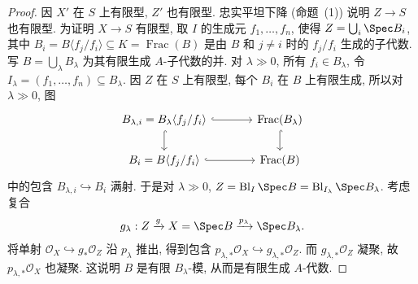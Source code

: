 \begin{proof}
因 $X'$ 在 $S$ 上有限型, $Z'$ 也有限型. 忠实平坦下降 (命题~(1)) 说明 $Z\to S$ 也有限型. 为证明 $X\to S$ 有限型, 取 $I$ 的生成元 $f_1,\ldots,f_n$, 使得 $Z=\bigcup_i\Spec B_i$, 其中 $B_i=B\langle f_j/f_i\rangle\subseteq K=\operatorname{Frac}(B)$ 是由 $B$ 和 $j\ne i$ 时的 $f_j/f_i$ 生成的子代数. 写 $B=\bigcup_\lambda B_\lambda$ 为其有限生成 $A$-子代数的并. 对 $\lambda\gg0$, 所有 $f_i\in B_\lambda$, 令 $I_\lambda=(f_1,\ldots,f_n)\subseteq B_\lambda$. 因 $Z$ 在 $S$ 上有限型, 每个 $B_i$ 在 $B$ 上有限生成, 所以对 $\lambda\gg0$, 图
\begin{align*}
\begin{tikzcd}[ampersand replacement=\&,column sep=large]
B_{\lambda,i}=B_\lambda\langle f_j/f_i\rangle\arrow[r,hook]\arrow[d,hook]\&\operatorname{Frac}(B_\lambda)\arrow[d,hook]\\
B_i=B\langle f_j/f_i\rangle\arrow[r,hook]\&\operatorname{Frac}(B)
\end{tikzcd}
\end{align*}
中的包含 $B_{\lambda,i}\hookrightarrow B_i$ 满射. 于是对 $\lambda\gg0$, $Z=\operatorname{Bl}_I\Spec B=\operatorname{Bl}_{I_\lambda}\Spec B_\lambda$. 考虑复合
\begin{align*}
g_\lambda:Z\xrightarrow{g}X=\Spec B\xrightarrow{p_\lambda}\Spec B_\lambda.
\end{align*}
将单射 $\mathcal O_X\hookrightarrow g_*\mathcal O_Z$ 沿 $p_\lambda$ 推出, 得到包含 $p_{\lambda,*}\mathcal O_X\hookrightarrow g_{\lambda,*}\mathcal O_Z$. 而 $g_{\lambda,*}\mathcal O_Z$ 凝聚, 故 $p_{\lambda,*}\mathcal O_X$ 也凝聚. 这说明 $B$ 是有限 $B_\lambda$-模, 从而是有限生成 $A$-代数.
\end{proof}
